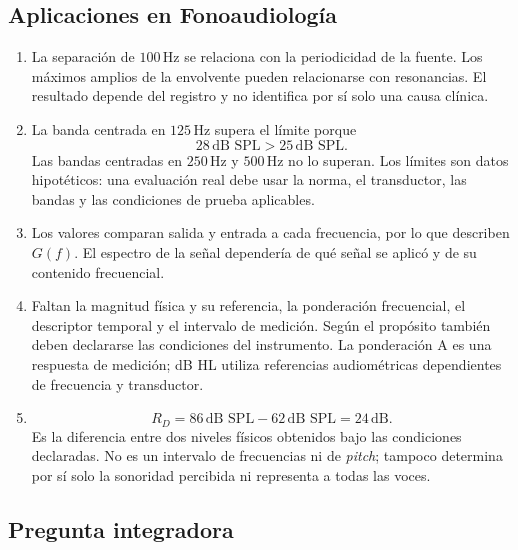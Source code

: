 \subsection*{Aplicaciones en Fonoaudiología}

\begin{enumerate}[label=\textbf{F\arabic*.},leftmargin=*]
    \item La separación de \(100\,\text{Hz}\) se relaciona con la periodicidad
    de la fuente. Los máximos amplios de la envolvente pueden relacionarse con
    resonancias. El resultado depende del registro y no identifica por sí solo
    una causa clínica.

    \item La banda centrada en \(125\,\text{Hz}\) supera el límite porque
    \[
        28\,\text{dB SPL}>25\,\text{dB SPL}.
    \]
    Las bandas centradas en \(250\,\text{Hz}\) y \(500\,\text{Hz}\) no lo
    superan. Los límites son datos hipotéticos: una evaluación real debe usar
    la norma, el transductor, las bandas y las condiciones de prueba
    aplicables.

    \item Los valores comparan salida y entrada a cada frecuencia, por lo que
    describen \(G(f)\). El espectro de la señal dependería de qué señal se
    aplicó y de su contenido frecuencial.

    \item Faltan la magnitud física y su referencia, la ponderación
    frecuencial, el descriptor temporal y el intervalo de medición. Según el
    propósito también deben declararse las condiciones del instrumento. La
    ponderación A es una respuesta de medición; dB HL utiliza referencias
    audiométricas dependientes de frecuencia y transductor.

    \item
    \[
        R_D=86\,\text{dB SPL}-62\,\text{dB SPL}=24\,\text{dB}.
    \]
    Es la diferencia entre dos niveles físicos obtenidos bajo las condiciones
    declaradas. No es un intervalo de frecuencias ni de \emph{pitch}; tampoco
    determina por sí solo la sonoridad percibida ni representa a todas las
    voces.
\end{enumerate}

\subsection*{Pregunta integradora}

